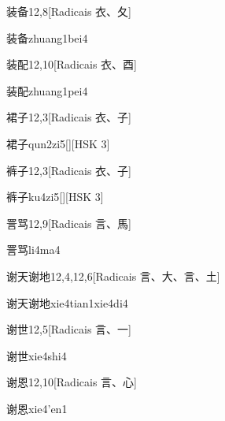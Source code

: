 \begin{entry}{装备}{12,8}[Radicais ⾐、⼡]
  \begin{phonetics}{装备}{zhuang1bei4}
  \end{phonetics}
\end{entry}

\begin{entry}{装配}{12,10}[Radicais ⾐、⾣]
  \begin{phonetics}{装配}{zhuang1pei4}
  \end{phonetics}
\end{entry}

\begin{entry}{裙子}{12,3}[Radicais ⾐、⼦]
  \begin{phonetics}{裙子}{qun2zi5}[][HSK 3]
  \end{phonetics}
\end{entry}

\begin{entry}{裤子}{12,3}[Radicais ⾐、⼦]
  \begin{phonetics}{裤子}{ku4zi5}[][HSK 3]
  \end{phonetics}
\end{entry}

\begin{entry}{詈骂}{12,9}[Radicais ⾔、⾺]
  \begin{phonetics}{詈骂}{li4ma4}
  \end{phonetics}
\end{entry}

\begin{entry}{谢天谢地}{12,4,12,6}[Radicais ⾔、⼤、⾔、⼟]
  \begin{phonetics}{谢天谢地}{xie4tian1xie4di4}
  \end{phonetics}
\end{entry}

\begin{entry}{谢世}{12,5}[Radicais ⾔、⼀]
  \begin{phonetics}{谢世}{xie4shi4}
  \end{phonetics}
\end{entry}

\begin{entry}{谢恩}{12,10}[Radicais ⾔、⼼]
  \begin{phonetics}{谢恩}{xie4'en1}
  \end{phonetics}
\end{entry}

